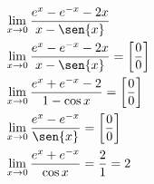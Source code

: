 \begin{ex}
\begin{align}
&\lim_{x\rightarrow 0} \frac{e^{x}-e^{-x}-2x}{x-\sen{x}}\nonumber\\
&\lim_{x\rightarrow 0} \frac{e^{x}-e^{-x}-2x}{x-\sen{x}} = \left[\frac{0}{0}\right]\nonumber\\
&\lim_{x\rightarrow 0} \frac{e^{x}+e^{-x}-2}{1-\cos{x}}=\left[\frac{0}{0}\right]\nonumber\\
&\lim_{x\rightarrow 0} \frac{e^{x}-e^{-x}}{\sen{x}}=\left[\frac{0}{0}\right]\nonumber\\
&\lim_{x\rightarrow 0} \frac{e^{x}+e^{-x}}{\cos{x}}=\frac{2}{1}=2\nonumber
\end{align}
\end{ex}
